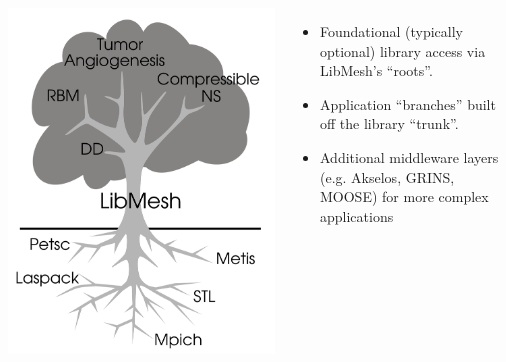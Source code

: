 \documentclass[mathserif]{beamer}
\begin{document}
\begin{frame}[t]
  \begin{columns}
    \begin{center}
      \includegraphics[width=.9\textwidth]{mytreeandroots_allnames}
    \end{center}
    \begin{itemize}
      \item Foundational (typically optional) library access via LibMesh's ``roots''.
      \item Application ``branches'' built off the library ``trunk''.
      \item Additional middleware layers (e.g. Akselos, GRINS, MOOSE) for more complex applications
    \end{itemize}
  \end{columns}

\end{frame}
\end{document}
